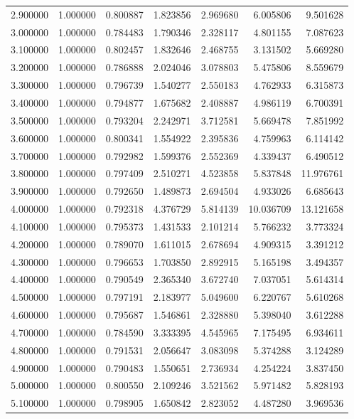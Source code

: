 \begin{table}
\begin{tabular}{rrrrrrr}
2.900000 & 1.000000 & 0.800887 & 1.823856 & 2.969680 & 6.005806 & 9.501628 \\
3.000000 & 1.000000 & 0.784483 & 1.790346 & 2.328117 & 4.801155 & 7.087623 \\
3.100000 & 1.000000 & 0.802457 & 1.832646 & 2.468755 & 3.131502 & 5.669280 \\
3.200000 & 1.000000 & 0.786888 & 2.024046 & 3.078803 & 5.475806 & 8.559679 \\
3.300000 & 1.000000 & 0.796739 & 1.540277 & 2.550183 & 4.762933 & 6.315873 \\
3.400000 & 1.000000 & 0.794877 & 1.675682 & 2.408887 & 4.986119 & 6.700391 \\
3.500000 & 1.000000 & 0.793204 & 2.242971 & 3.712581 & 5.669478 & 7.851992 \\
3.600000 & 1.000000 & 0.800341 & 1.554922 & 2.395836 & 4.759963 & 6.114142 \\
3.700000 & 1.000000 & 0.792982 & 1.599376 & 2.552369 & 4.339437 & 6.490512 \\
3.800000 & 1.000000 & 0.797409 & 2.510271 & 4.523858 & 5.837848 & 11.976761 \\
3.900000 & 1.000000 & 0.792650 & 1.489873 & 2.694504 & 4.933026 & 6.685643 \\
4.000000 & 1.000000 & 0.792318 & 4.376729 & 5.814139 & 10.036709 & 13.121658 \\
4.100000 & 1.000000 & 0.795373 & 1.431533 & 2.101214 & 5.766232 & 3.773324 \\
4.200000 & 1.000000 & 0.789070 & 1.611015 & 2.678694 & 4.909315 & 3.391212 \\
4.300000 & 1.000000 & 0.796653 & 1.703850 & 2.892915 & 5.165198 & 3.494357 \\
4.400000 & 1.000000 & 0.790549 & 2.365340 & 3.672740 & 7.037051 & 5.614314 \\
4.500000 & 1.000000 & 0.797191 & 2.183977 & 5.049600 & 6.220767 & 5.610268 \\
4.600000 & 1.000000 & 0.795687 & 1.546861 & 2.328880 & 5.398040 & 3.612288 \\
4.700000 & 1.000000 & 0.784590 & 3.333395 & 4.545965 & 7.175495 & 6.934611 \\
4.800000 & 1.000000 & 0.791531 & 2.056647 & 3.083098 & 5.374288 & 3.124289 \\
4.900000 & 1.000000 & 0.790483 & 1.550651 & 2.736934 & 4.254224 & 3.837450 \\
5.000000 & 1.000000 & 0.800550 & 2.109246 & 3.521562 & 5.971482 & 5.828193 \\
5.100000 & 1.000000 & 0.798905 & 1.650842 & 2.823052 & 4.487280 & 3.969536 \\

\end{tabular}
\end{table}
